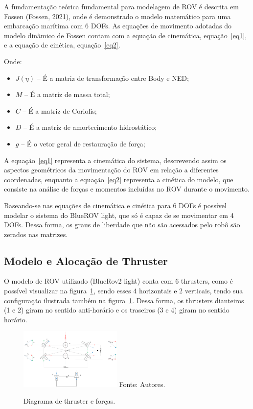 \documentclass[../main.tex]{subfiles}
\begin{document}
A fundamentação teórica fundamental para modelagem de ROV é descrita em Fossen (Fossen, 2021), onde é demonstrado o modelo matemático para uma embarcação marítima com 6 DOFs. As equações de movimento adotadas do modelo dinâmico de Fossen contam com a equação de cinemática, equação~\ref{eq1}, e a equação de cinética, equação~\ref{eq2}.

Onde:
\begin{itemize}
    \item $J(\eta)$ -- É a matriz de transformação entre Body e NED;
    \item $M$ -- É a matriz de massa total;
    \item $C$ -- É a matriz de Coriolis;
    \item $D$ -- É a matriz de amortecimento hidrostático;
    \item $g$ -- É o vetor geral de restauração de força;
\end{itemize}


A equação~\ref{eq1} representa a cinemática do sistema, descrevendo assim os aspectos geométricos da movimentação do ROV em relação a diferentes coordenadas, enquanto a equação~\ref{eq2} representa a cinética do modelo, que consiste na análise de forças e momentos incluídas no ROV durante o movimento.

Baseando-se nas equações de cinemática e cinética para 6 DOFs é possível modelar o sistema do BlueROV light, que só é capaz de se movimentar em 4 DOFs. Dessa forma, os graus de liberdade que não são acessados pelo robô são zerados nas matrizes.

\subsection{Modelo e Alocação de Thruster}
O modelo de ROV utilizado (BlueRov2 light) conta com 6 thrusters, como é possível visualizar na figura~\ref{force_diagram}, sendo esses 4 horizontais e 2 verticais, tendo sua configuração ilustrada também na figura~\ref{force_diagram}. Dessa forma, os thrusters dianteiros (1 e 2) giram no sentido anti-horário e os traseiros (3 e 4) giram no sentido horário.

\begin{figure}[!htb]
  \centering
  \caption{Diagrama de thruster e forças.}
  \includegraphics[width=0.45\textwidth]{images/Alocaçao-thrusters-vetor-força-blureov2-light.png}
  \vfill
  Fonte: Autores.
  \label{force_diagram}
\end{figure}
\end{document}
